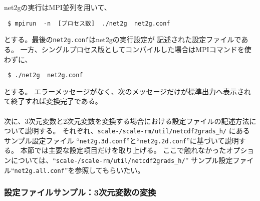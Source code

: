 net2gの実行はMPI並列を用いて、
\begin{verbatim}
 $ mpirun  -n  [プロセス数]  ./net2g  net2g.conf
\end{verbatim}
とする。最後の\verb|net2g.conf|はnet2gの実行設定が
記述された設定ファイルである。
一方、シングルプロセス版としてコンパイルした場合はMPIコマンドを使わずに、
\begin{verbatim}
 $ ./net2g  net2g.conf
\end{verbatim}
とする。
エラーメッセージがなく、次のメッセージだけが標準出力へ表示されて終了すれば変換完了である。\\

\\

次に、3次元変数と2次元変数を変換する場合における設定ファイルの記述方法について説明する。
それぞれ、\texttt{scale-\version/scale-rm/util/netcdf2grads\_h/} にあるサンプル設定ファイル
``\verb|net2g.3d.conf|''と``\verb|net2g.2d.conf|''に基づいて説明する。
本節では主要な設定項目だけを取り上げる。
ここで触れなかったオプションについては、``\texttt{scale-\version/scale-rm/util/netcdf2grads\_h/}''
サンプル設定ファイル``\verb|net2g.all.conf|''を参照してもらいたい。


\subsubsection{設定ファイルサンプル：3次元変数の変換}

\\

